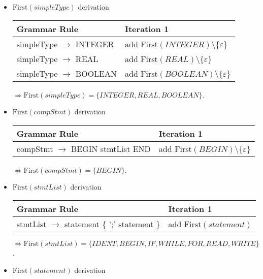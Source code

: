 \documentclass[8pt]{scrartcl}
\newcommand{\First}[1]{\mathrm{First}(#1)}
\newcommand{\epsset}{\{\varepsilon\}}
\begin{document}
\begin{itemize}
            \item $\First{simpleType}$ derivation\newline
                \begin{tabular}{|l |l |}
                    \hline
                    \textbf{Grammar Rule} & \textbf{Iteration 1}\\
                    \hline
                    simpleType $\rightarrow$ INTEGER & add $\First{INTEGER} \setminus \epsset$\\
                    \hline
                    simpleType $\rightarrow$ REAL & add $\First{REAL} \setminus \epsset$\\
                    \hline
                    simpleType $\rightarrow$ BOOLEAN & add $\First{BOOLEAN} \setminus \epsset$\\
                    \hline
                \end{tabular}\newline
                $\Rightarrow \First{simpleType} = \{INTEGER, REAL, BOOLEAN\}$.
            \item $\First{compStmt}$ derivation\newline
                \begin{tabular}{|l |l |}
                    \hline
                    \textbf{Grammar Rule} & \textbf{Iteration 1}\\
                    \hline
                    compStmt $\rightarrow$ BEGIN stmtList END & add $\First{BEGIN} \setminus \epsset$\\
                    \hline
                \end{tabular}\newline
                $\Rightarrow \First{compStmt} = \{BEGIN\}$.
            \item $\First{stmtList}$ derivation\newline
                \begin{tabular}{|l |l |}
                    \hline
                    \textbf{Grammar Rule} & \textbf{Iteration 1}\\
                    \hline
                    stmtList $\rightarrow$ statement \{ ';' statement \} & add $\First{statement}$\\
                    \hline
                \end{tabular}\newline
                $\Rightarrow \First{stmtList} = \{IDENT, BEGIN, IF, WHILE, FOR, READ, WRITE\}$.
            \item $\First{statement}$ derivation\newline

\end{itemize}
\end{document}
